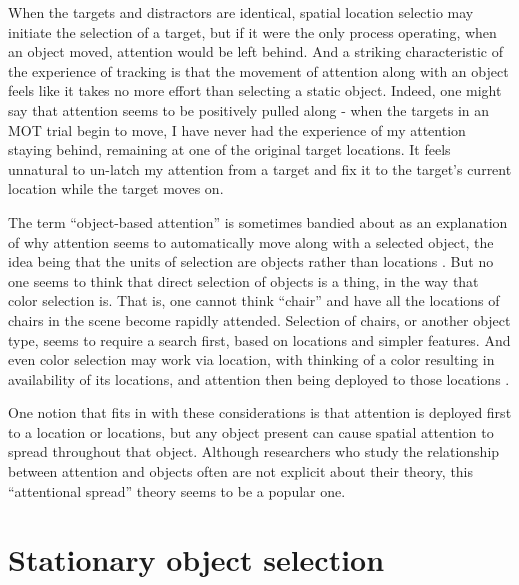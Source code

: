 \documentclass[
]{book}
\begin{document}
When the targets and distractors are identical, spatial location selectio may initiate the selection of a target, but if it were the only process operating, when an object moved, attention would be left behind. And a striking characteristic of the experience of tracking is that the movement of attention along with an object feels like it takes no more effort than selecting a static object. Indeed, one might say that attention seems to be positively pulled along - when the targets in an MOT trial begin to move, I have never had the experience of my attention staying behind, remaining at one of the original target locations. It feels unnatural to un-latch my attention from a target and fix it to the target's current location while the target moves on.

The term ``object-based attention'' is sometimes bandied about as an explanation of why attention seems to automatically move along with a selected object, the idea being that the units of selection are objects rather than locations \citep{pylyshynSeeingVisualizingIt2006, clarkLocationLocationLocation2009}. But no one seems to think that direct selection of objects is a thing, in the way that color selection is. That is, one cannot think ``chair'' and have all the locations of chairs in the scene become rapidly attended. Selection of chairs, or another object type, seems to require a search first, based on locations and simpler features. And even color selection may work via location, with thinking of a color resulting in availability of its locations, and attention then being deployed to those locations \citep{shihThereFeaturebasedAttentional1996a}.

One notion that fits in with these considerations is that attention is deployed first to a location or locations, but any object present can cause spatial attention to spread throughout that object. Although researchers who study the relationship between attention and objects often are not explicit about their theory, this ``attentional spread'' theory seems to be a popular one.

\hypertarget{stationary-object-selection}{%
\section{Stationary object selection}\label{stationary-object-selection}}
\end{document}
